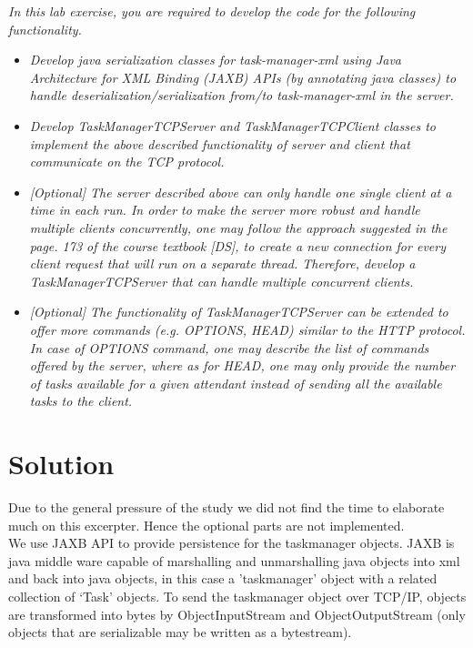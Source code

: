 \textit{In this lab exercise, you are required to develop the code for the following functionality.}\\

\begin{itemize}
\item \textit{Develop java serialization classes for task-manager-xml using Java Architecture for XML Binding (JAXB) APIs (by annotating java classes) to handle deserialization/serialization from/to task-manager-xml in the server.}\\

\item \textit{Develop TaskManagerTCPServer and TaskManagerTCPClient classes to implement the above described functionality of server and client that communicate on the TCP protocol.}\\

\item \textit{[Optional] The server described above can only handle one single client at a time in each run. In order to make the server more robust and handle multiple clients concurrently, one may follow the approach suggested in the page. 173 of the course textbook [DS], to create a new connection for every client request that will run on a separate thread. Therefore, develop a TaskManagerTCPServer that can handle multiple concurrent clients.}\\

\item \textit{[Optional] The functionality of TaskManagerTCPServer can be extended to offer more commands (e.g. OPTIONS, HEAD) similar to the HTTP protocol. In case of OPTIONS command, one may describe the list of commands offered by the server, where as for HEAD, one may only provide the number of tasks available for a given attendant instead of sending all the available tasks to the client.}\\

\end{itemize}

\section{Solution}
\label{tcp_solution}

Due to the general pressure of the study we did not find the time to elaborate much on this excerpter. Hence the optional parts are not implemented.\\

We use JAXB API to provide persistence for the taskmanager objects. JAXB is java middle ware capable of marshalling and unmarshalling java objects into xml and back into java objects, in this case a 'taskmanager' object with a related collection of ‘Task’ objects. To send the taskmanager object over TCP/IP, objects are transformed into bytes by ObjectInputStream and ObjectOutputStream (only objects that are serializable may be written as a bytestream).   \\ 

